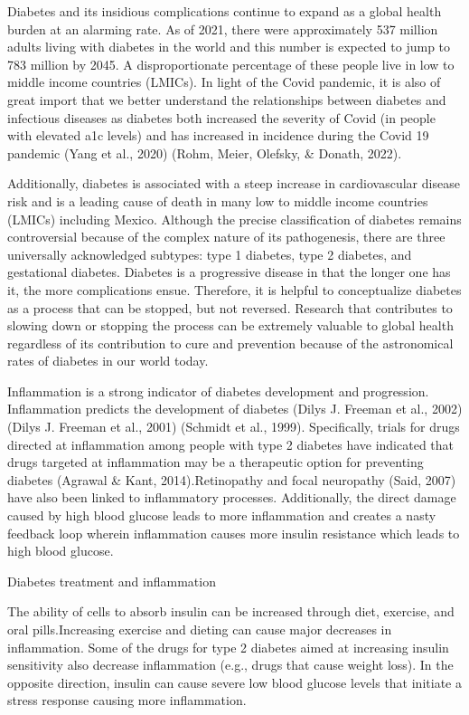 \documentclass[
  man,floatsintext]{apa6}
\begin{document}
Diabetes and its insidious complications continue to expand as a global health burden at an alarming rate. As of 2021, there were approximately 537 million adults living with diabetes in the world and this number is expected to jump to 783 million by 2045. A disproportionate percentage of these people live in low to middle income countries (LMICs). In light of the Covid pandemic, it is also of great import that we better understand the relationships between diabetes and infectious diseases as diabetes both increased the severity of Covid (in people with elevated a1c levels) and has increased in incidence during the Covid 19 pandemic (Yang et al., 2020) (Rohm, Meier, Olefsky, \& Donath, 2022).

Additionally, diabetes is associated with a steep increase in cardiovascular disease risk and is a leading cause of death in many low to middle income countries (LMICs) including Mexico. Although the precise classification of diabetes remains controversial because of the complex nature of its pathogenesis, there are three universally acknowledged subtypes: type 1 diabetes, type 2 diabetes, and gestational diabetes. Diabetes is a progressive disease in that the longer one has it, the more complications ensue. Therefore, it is helpful to conceptualize diabetes as a process that can be stopped, but not reversed. Research that contributes to slowing down or stopping the process can be extremely valuable to global health regardless of its contribution to cure and prevention because of the astronomical rates of diabetes in our world today.

Inflammation is a strong indicator of diabetes development and progression. Inflammation predicts the development of diabetes (Dilys J. Freeman et al., 2002) (Dilys J. Freeman et al., 2001) (Schmidt et al., 1999). Specifically, trials for drugs directed at inflammation among people with type 2 diabetes have indicated that drugs targeted at inflammation may be a therapeutic option for preventing diabetes (Agrawal \& Kant, 2014).Retinopathy and focal neuropathy (Said, 2007) have also been linked to inflammatory processes. Additionally, the direct damage caused by high blood glucose leads to more inflammation and creates a nasty feedback loop wherein inflammation causes more insulin resistance which leads to high blood glucose.

Diabetes treatment and inflammation

The ability of cells to absorb insulin can be increased through diet, exercise, and oral pills.Increasing exercise and dieting can cause major decreases in inflammation. Some of the drugs for type 2 diabetes aimed at increasing insulin sensitivity also decrease inflammation (e.g., drugs that cause weight loss). In the opposite direction, insulin can cause severe low blood glucose levels that initiate a stress response causing more inflammation.
\end{document}

